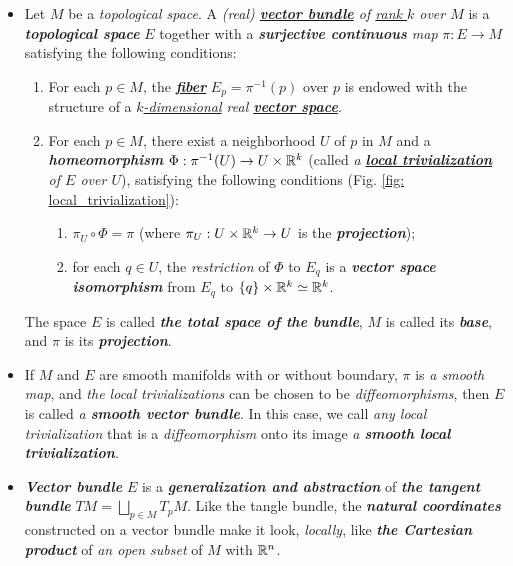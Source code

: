 \documentclass[11pt]{article}
\begin{document}
\begin{itemize}
\item \begin{definition}
Let $M$ be a \emph{topological space}. A \emph{(real) \underline{\textbf{vector bundle}} of \underline{rank $k$} over $M$} is a \emph{\textbf{topological space}} $E$ together with a \emph{\textbf{surjective continuous} map} $\pi: E \rightarrow M$ satisfying the following conditions:
\begin{enumerate}
\item For each $p \in M$, the \underline{\emph{\textbf{fiber}}} $E_{p} = \pi^{-1}(p)$ over $p$ is endowed with the structure of a \emph{\underline{$k$-dimensional} real \underline{\textbf{vector space}}}.
\item For each $p \in M$, there exist a neighborhood $U$ of $p$ in $M$ and a \emph{\textbf{homeomorphism}} $\Phi: \pi^{-1}(U) \rightarrow U \times {\mathbb R}^k$ (called \emph{a \underline{\textbf{local trivialization}} of $E$ over $U$}), satisfying the following conditions (Fig. \ref{fig: local_trivialization}):
\begin{enumerate}
\item $\pi_{U}\circ \Phi = \pi$ (where $\pi_U: U \times  {\mathbb R}^k \rightarrow U$ is the \emph{\textbf{projection}});
\item for each $q \in U$, the \emph{restriction} of $\Phi$ to $E_q$ is a \emph{\textbf{vector space}} \emph{\textbf{isomorphism}} from
$E_q$ to $\left\{q\right\} \times {\mathbb R}^k \simeq {\mathbb R}^k$.
\end{enumerate}
\end{enumerate}
The space $E$ is called \emph{\textbf{the total space of the bundle}}, $M$ is called its \emph{\textbf{base}}, and $\pi$ is its \emph{\textbf{projection}}. 
\end{definition}

\item \begin{definition}
If $M$ and $E$ are smooth manifolds with or without boundary, $\pi$ is \emph{a smooth map}, and \emph{the local trivializations} can be chosen to be \emph{diffeomorphisms}, then $E$ is called \emph{a \textbf{smooth vector bundle}}. In this case, we call \emph{any local trivialization} that is a \emph{diffeomorphism} onto its image \emph{a \textbf{smooth local trivialization}}.
\end{definition}


\item \begin{remark}
\emph{\textbf{Vector bundle}} $E$ is a \emph{\textbf{generalization and abstraction}} of \emph{\textbf{the tangent bundle}} $TM = \bigsqcup_{p\in M}T_{p}M$. Like the tangle bundle,  the \emph{\textbf{natural coordinates}} constructed on a vector bundle make it look, \emph{locally}, like \emph{\textbf{the Cartesian product}} of \emph{an open subset} of $M$ with ${\mathbb R}^n$. 
\end{remark}



\end{itemize}
\end{document}
